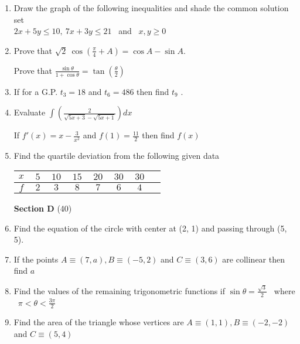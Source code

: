 \documentclass[16pt,a4paper]{article}
\begin{document}
\begin{enumerate}
\item Draw the graph of the following inequalities and shade the common solution set \\ $2x + 5y \le 10,\ 7x + 3y \le 21$ \ and \ $ x, y \ge 0$

\item Prove that $\sqrt 2\ \cos \left( \frac {\pi}{4}+ A \right) = \cos A - \sin A$.

Prove that $\frac {\sin \theta }{1 + \cos \theta} = \tan \left( \frac {\theta }{2} \right) $

\item If for a G.P. $t_3 = 18$ and $t_6 = 486$ then find $t_9$ .

\item Evaluate $\int  \left(\frac{2}{\sqrt{5x+3} - \sqrt{5x+1} } \right) dx $


If $ f'(x) = x - \frac {3}{x^2}$ and $ f(1) = \frac {11}{2} $ then find $f(x)$

\item Find the quartile deviation from the following given data  \\

\begin{tabular}{|c|*{7}{c|}}
\hline
$x \ $ & $5\ $ & $10\ $ & $15\ $ & $20\ $ & $30\ $ & $30\ $ \\
\hline
$f \ $ & $2\ $ & $3\ $ & $8\ $ & $7\ $ & $6\ $ & $4\ $ \\
\hline
 \end{tabular} 
 

\begin{center}
\hfill \textbf{Section D} \tabto{16.9cm}(40)
\end{center}

\item Find the equation of the circle with center at (2, 1) and passing through (5, 5). 

\item If the points $ A\equiv (7, a), B \equiv (-5, 2)$ and $ C \equiv (3, 6) $ are collinear then find $ a $

\item Find the values of the remaining trigonometric functions if $ \sin \theta = \frac {\sqrt 3}{2}$ \ where \ $\pi < \theta < \frac{3\pi}{2} $

\item Find the area of the triangle whose vertices are $ A\equiv (1,1), B \equiv (-2,-2)$ and $ C \equiv (5,4)$


\end{enumerate}
\end{document}
